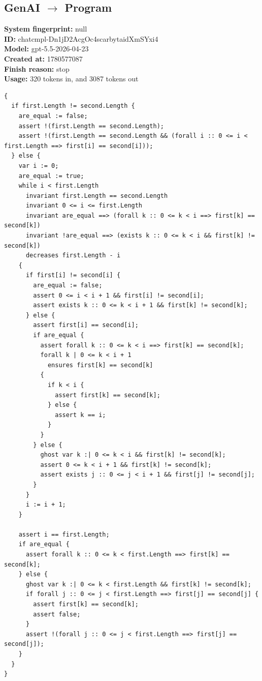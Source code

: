 \documentclass{article}
\begin{document}
\subsection*{GenAI $\rightarrow$ Program}
\textbf{System fingerprint: }null
\\\textbf{ID: }chatcmpl-Dn1jD2AcgOc4scarbytaidXmSYxi4
\\\textbf{Model: }gpt-5.5-2026-04-23
\\\textbf{Created at: }1780577087
\\\textbf{Finish reason: }stop
\\\textbf{Usage: }320 tokens in, and 3087 tokens out
\begin{lstlisting}
{
  if first.Length != second.Length {
    are_equal := false;
    assert !(first.Length == second.Length);
    assert !(first.Length == second.Length && (forall i :: 0 <= i < first.Length ==> first[i] == second[i]));
  } else {
    var i := 0;
    are_equal := true;
    while i < first.Length
      invariant first.Length == second.Length
      invariant 0 <= i <= first.Length
      invariant are_equal ==> (forall k :: 0 <= k < i ==> first[k] == second[k])
      invariant !are_equal ==> (exists k :: 0 <= k < i && first[k] != second[k])
      decreases first.Length - i
    {
      if first[i] != second[i] {
        are_equal := false;
        assert 0 <= i < i + 1 && first[i] != second[i];
        assert exists k :: 0 <= k < i + 1 && first[k] != second[k];
      } else {
        assert first[i] == second[i];
        if are_equal {
          assert forall k :: 0 <= k < i ==> first[k] == second[k];
          forall k | 0 <= k < i + 1
            ensures first[k] == second[k]
          {
            if k < i {
              assert first[k] == second[k];
            } else {
              assert k == i;
            }
          }
        } else {
          ghost var k :| 0 <= k < i && first[k] != second[k];
          assert 0 <= k < i + 1 && first[k] != second[k];
          assert exists j :: 0 <= j < i + 1 && first[j] != second[j];
        }
      }
      i := i + 1;
    }

    assert i == first.Length;
    if are_equal {
      assert forall k :: 0 <= k < first.Length ==> first[k] == second[k];
    } else {
      ghost var k :| 0 <= k < first.Length && first[k] != second[k];
      if forall j :: 0 <= j < first.Length ==> first[j] == second[j] {
        assert first[k] == second[k];
        assert false;
      }
      assert !(forall j :: 0 <= j < first.Length ==> first[j] == second[j]);
    }
  }
}
\end{lstlisting}
\end{document}
